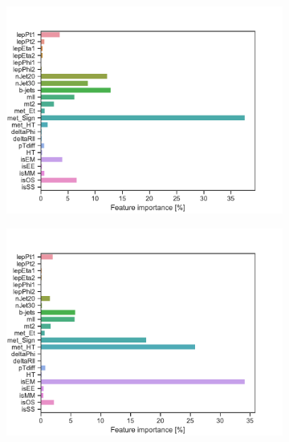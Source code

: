 \begin{figure}[H]
\begin{subfigure}[t!]{0.49\textwidth}
        \includegraphics[width = \textwidth]{Figures/WW/BDT/All_level/High/featureImportance.pdf}
        \caption{}
        \label{fig:featWWLow}
    \end{subfigure}
    \begin{subfigure}[t!]{0.49\textwidth}
        \includegraphics[width = \textwidth]{Figures/Mono_Z/ML/BDT/All_level/High/featureImportance.pdf}
        \caption{}
        \label{fig:featMonoZLow}
    \end{subfigure}
    \caption{}
    \label{fig:Non}
\end{figure}



